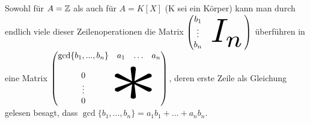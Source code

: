 \documentclass[../../main.tex]{subfiles}
\begin{document}
\noindent Sowohl für $A=\mathbb Z$ als auch für $A=K[X]$ (K sei ein Körper) kann man durch endlich viele dieser Zeilenoperationen die Matrix $\begin{pmatrix}b_1&&&&&\\\vdots&&&&\\
b_n&&&&&\begin{tikzpicture}[overlay]\node[xshift=-0.7cm,yshift=0.6cm,scale=4]{$I_n$};\end{tikzpicture}
\end{pmatrix}$ überführen in eine Matrix $\begin{pmatrix}\gcd\{b_1,...,b_n\}& a_1 & \hdots & a_n\\
\\0&&&\\\vdots&&&\begin{tikzpicture}[overlay]\node[xshift=-0.9cm,yshift=0.4cm,xscale=12,yscale=9]{$*$};\end{tikzpicture}\
\\0&&&
\end{pmatrix}$, deren erste Zeile als Gleichung gelesen besagt, dass $\gcd\{b_1,...,b_n\}=a_1b_1+...+a_nb_n$.
\end{document}
